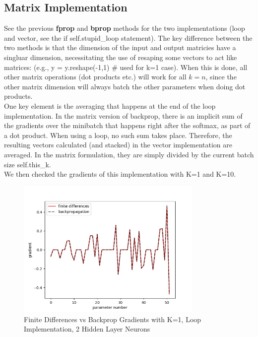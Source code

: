 \documentclass[reqno]{amsart}
\theoremstyle{definition}
\theoremstyle{remark}
\numberwithin{equation}{section}
\begin{document}
\subsection{Matrix Implementation}

See the previous \textbf{fprop} and \textbf{bprop} methods for the two implementations (loop and vector, see the if self.stupid\_loop statement). The key difference between the two methods is that the dimension of the input and output matricies have a singluar dimension, necessitating the use of resaping some vectors to act like matrices: (e.g.,  y = y.reshape(-1,1) # used for k=1 case). When this is done, all other matrix operations (dot products etc.) will work for all $k=n$, since the other matrix dimension will always batch the other parameters when doing dot products.\\

One key element is the averaging that happens at the end of the loop implementation. In the matrix version of backprop, there is an implicit sum of the gradients over the minibatch that happens right after the softmax, as part of a dot product. When using a loop, no such sum takes place. Therefore, the resulting vectors calculated (and stacked) in the vector implementation are averaged. In the matrix formulation, they are simply divided by the current batch size self.this\_k. \\

We then checked the gradients of this implementation with K=1 and K=10. \\

\begin{figure}[H]
    \centering
    \includegraphics[width=0.8\textwidth]{gradient_differences_LOOP_k1}
    \caption{Finite Differences vs Backprop Gradients with K=1, Loop Implementation, 2 Hidden Layer Neurons}
    \label{fig:gradient_differences_LOOP_k1}
\end{figure}
\end{document}
